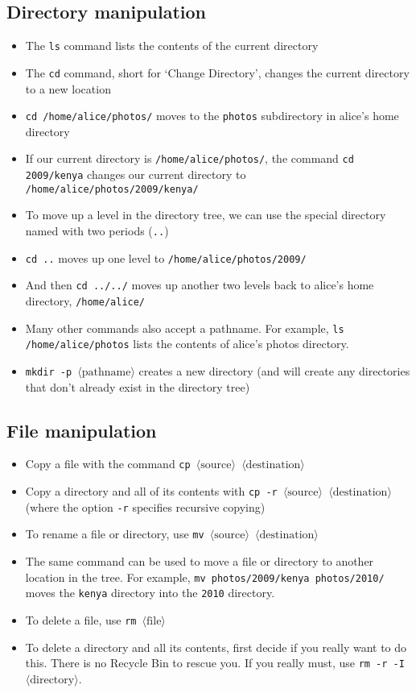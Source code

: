 \documentclass[a4paper,twoside]{memoir}
\newcommand{\shellcmd}{\texttt}
\newcommand{\shellvar}[1]{$\langle \text{#1}\rangle$}
\begin{document}
\subsection{Directory manipulation}
\begin{itemize}
\item The \shellcmd{ls} command lists the contents of the current directory
\item The \shellcmd{cd} command, short for `Change Directory', changes the current directory to a new location
\item \shellcmd{cd /home/alice/photos/} moves to the \shellcmd{photos} subdirectory in alice's home directory
\item If our current directory is \shellcmd{/home/alice/photos/}, the command \shellcmd{cd 2009/kenya} changes our current directory to \shellcmd{/home/alice/photos/2009/kenya/}
\item To move up a level in the directory tree, we can use the special directory named with two periods (\shellcmd{..})
\item \shellcmd{cd ..} moves up one level to \shellcmd{/home/alice/photos/2009/}
\item And then \shellcmd{cd ../../} moves up another two levels back to alice's home directory, \shellcmd{/home/alice/}
\item Many other commands also accept a pathname.  For example, \shellcmd{ls /home/alice/photos} lists the contents of alice's photos directory.
\item \shellcmd{mkdir -p \shellvar{pathname}} creates a new directory (and will create any directories that don't already exist in the directory tree)
\end{itemize}

\subsection{File manipulation}
\begin{itemize}
\item Copy a file with the command \shellcmd{cp \shellvar{source} \shellvar{destination}}
\item Copy a directory and all of its contents with \shellcmd{cp -r \shellvar{source} \shellvar{destination}} (where the option \shellcmd{-r} specifies recursive copying)
\item To rename a file or directory, use \shellcmd{mv \shellvar{source} \shellvar{destination}}
\item The same command can be used to move a file or directory to another location in the tree.  For example, \shellcmd{mv photos/2009/kenya photos/2010/} moves the \shellcmd{kenya} directory into the \shellcmd{2010} directory.
\item To delete a file, use \shellcmd{rm \shellvar{file}}
\item To delete a directory and all its contents, first decide if you really want to do this.  There is no Recycle Bin to rescue you.  If you really must, use \shellcmd{rm -r -I \shellvar{directory}}.
\end{itemize}
\end{document}
